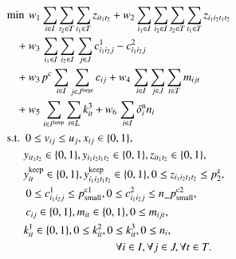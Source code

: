 \documentclass[a4j,11pt,twocolumn]{jsarticle}
\begin{document}
\begin{align}
&\textrm{min} \hspace{0.4em} w_1 \sum_{i \in I} \sum_{t_2 \in T}  \sum_{t_1 \in T} {z_{it_1t_2}} + w_2 \sum_{i_1 \in I} \sum_{i_2 \in I} \sum_{t_2 \in T} \sum_{t_1 \in T} {z_{i_1i_2t_1t_2}} \notag \\
&\hspace{0.85em} + w_3  \hspace{0.1em} \sum_{i_1\in I} \sum_{i_2\in I} \hspace{0.1em} \sum_{j \in J} {c_{i_1i_2j}^1} - {c_{i_1i_2j}^2} \notag \\
&\hspace{0.85em} + w_3 \hspace{0.1em} p^{\rm{c}} \sum_{i \in I} \sum_{j \in J^{\rm{large}}} {c_{ij}} + w_4 \hspace{0.1em} \sum_{i \in I} \sum_{j\in J} \sum_{t \in T}  {m_{ijt}} \notag \\
&\hspace{0.85em}  + w_5 \hspace{0.1em}  \sum_{i \in I^{\rm{lamp}}} \sum_{t \in L} {k_{it}^3} + w_6 \hspace{0.1em} \sum_{i \in I} \delta_i^{\rm{n}} {n_{i}} \\  %
&\textrm{s.t.} \hspace{0.5em} 0 \leq v_{ij} \leq u_j, x_{ij} \in \{ 0 , 1 \}, \notag \\
&\hspace{1.5em} {y_{it_1t_2}} \in \{ 0 , 1 \}, {y_{i_1i_2t_1t_2}} \in \{ 0 , 1 \}, z_{it_1t_2} \in \{ 0 , 1 \}, \notag \\
&\hspace{1.5em} {y_{it}^{\rm{keep}}} \in \{ 0 , 1 \}, {y_{i_1i_2t_1t_2}^{\rm{keep}}} \in \{ 0 , 1 \}, 0 \leq z_{i_1i_2t_1t_2} \leq p_2^{\rm{z}}, \notag \\
&\hspace{1.7em} 0 \leq c^1_{i_1i_2j} \leq p_{\rm{small}}^{\rm{c1}}, 0 \leq c^2_{i_1i_2j} \leq n\_p_{\rm{small}}^{\rm{c2}}, \notag \\
&\hspace{1.7em} c_{ij} \in \{ 0 , 1 \}, {m_{it}} \in \{ 0 , 1 \}, 0 \leq m_{ijt}, \notag \\
&\hspace{1.5em} {k^1_{it}} \in \{ 0 , 1 \}, 0 \leq {k^2_{it}}, 0 \leq k^3_{it}, 0 \leq n_{i}, \notag \\
&\hspace{9.76em} \forall i \in I, \forall j \in J, \forall t \in T. \\ %

\end{align}
\end{document}
